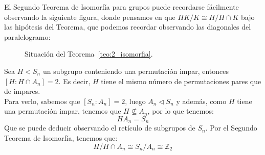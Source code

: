 \noindent
El Segundo Teorema de Isomorfía para grupos puede recordarse fácilmente observando la siguiente figura, donde pensamos en que $HK/K\cong H/H\cap K$ bajo las hipótesis del Teorema, que podemos recordar observando las diagonales del paralelogramo:
\begin{figure}[H]
    \centering
    \caption{Situación del Teorema~\ref{teo:2_isomorfia}.}
    \label{fig:2_isomorfia}
\end{figure}

\begin{ejemplo} %
    Sea $H<S_n$ un subgrupo conteniendo una permutación impar, entonces $[H:H\cap A_n]=2$. Es decir, $H$ tiene el mismo número de permutaciones pares que de impares.\\

    \noindent
    Para verlo, sabemos que $[S_n : A_n] = 2$, luego $A_n\lhd S_n$ y además, como $H$ tiene una permutación impar, tenemos que $H\nsubseteq A_n$, por lo que tenemos:
    \begin{equation*}
        HA_n = S_n
    \end{equation*}
    Que se puede deducir observando el retículo de subgrupos de $S_n$. Por el Segundo Teorema de Isomorfía, tenemos que:
    \begin{equation*}
        H/H\cap A_n \cong S_n/A_n \cong \mathbb{Z}_2
    \end{equation*}
\end{ejemplo}

